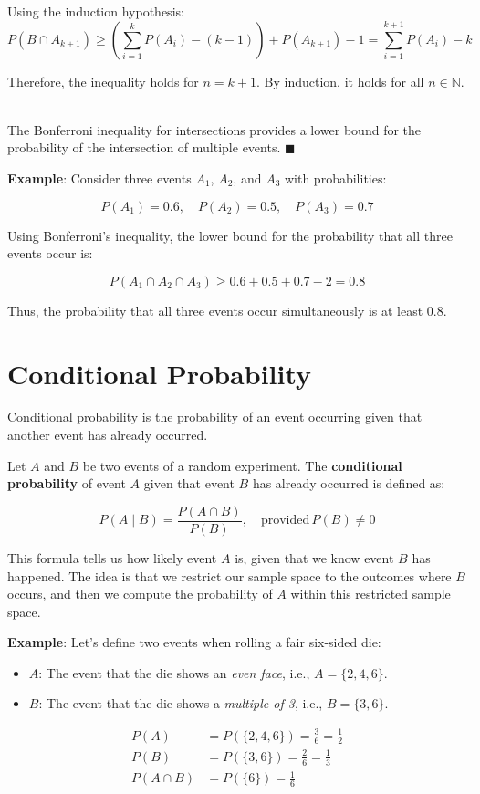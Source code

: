 \documentclass[twoside]{book}
\begin{document}
Using the induction hypothesis:
\[
P(B \cap A_{k+1}) \geq \left( \sum_{i=1}^{k} P(A_i) - (k - 1) \right) + P(A_{k+1}) - 1 = \sum_{i=1}^{k+1} P(A_i) - k
\]

Therefore, the inequality holds for \( n = k + 1 \). By induction, it holds for all \( n \in \mathbb{N} \). \

The Bonferroni inequality for intersections provides a lower bound for the probability of the intersection of multiple events.
\hfill\(\blacksquare\)

\textbf{Example}: Consider three events \( A_1 \), \( A_2 \), and \( A_3 \) with probabilities:

\[
P(A_1) = 0.6, \quad P(A_2) = 0.5, \quad P(A_3) = 0.7
\]

Using Bonferroni’s inequality, the lower bound for the probability that all three events occur is:

\[
P(A_1 \cap A_2 \cap A_3) \geq 0.6 + 0.5 + 0.7 - 2 = 0.8
\]

Thus, the probability that all three events occur simultaneously is at least \( 0.8 \).


\section{Conditional Probability}

Conditional probability is the probability of an event occurring given that another event has already occurred.

\begin{textbox}
    Let $A$ and $B$ be two events of a random experiment. The \textbf{conditional probability} of event \( A \) given that event \( B \) has already occurred is defined as:

\[
P(A \mid B) = \frac{P(A \cap B)}{P(B)}, \quad \text{provided} \, P(B) \neq 0
\]
\end{textbox}

This formula tells us how likely event \( A \) is, given that we know event \( B \) has happened. The idea is that we restrict our sample space to the outcomes where \( B \) occurs, and then we compute the probability of \( A \) within this restricted sample space.

\textbf{Example}: Let's define two events when rolling a fair six-sided die:

\begin{itemize}
    \item \( A \): The event that the die shows an \textit{even face}, i.e., \( A = \{2, 4, 6\} \).
    \item \( B \): The event that the die shows a \textit{multiple of 3}, i.e., \( B = \{3, 6\} \).
\end{itemize}
\begin{align*}
    P(A) &= P(\{2, 4, 6\})= \frac{3}{6} = \frac{1}{2} \\
    P(B) &= P(\{3, 6\})=  \frac{2}{6} = \frac{1}{3} \\
    P(A \cap B) &= P(\{6\}) = \frac{1}{6}
\end{align*}
\end{document}
